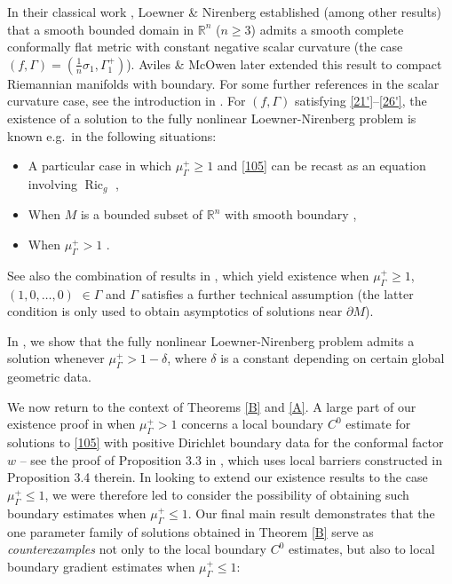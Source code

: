 \documentclass[12pt]{article}
\numberwithin{equation}{section}
\theoremstyle{plain}
\theoremstyle{definition}
\begin{document}
In their classical work \cite{LN74}, Loewner \& Nirenberg established (among other results) that a smooth bounded domain in $\mathbb{R}^n$ ($n\geq 3$) admits a smooth complete conformally flat metric with constant negative scalar curvature (the case $(f,\Gamma) = (\frac{1}{n}\sigma_1,\Gamma_1^+)$). Aviles \& McOwen \cite{AM88} later extended this result to compact Riemannian manifolds with boundary. For some further references in the scalar curvature case, see the introduction in \cite{DN23}. For $(f,\Gamma)$ satisfying \eqref{21'}--\eqref{26'}, the existence of a solution to the fully nonlinear Loewner-Nirenberg problem is known e.g.~in the following situations:\smallskip
\begin{itemize}
	\item A particular case in which $\mu_\Gamma^+ \geq 1$ and \eqref{105} can be recast as an equation involving $\operatorname{Ric}_g$ \cite{GSW11},\smallskip
	\item When $M$ is a bounded subset of $\mathbb{R}^n$ with smooth boundary \cite{GLN18},\smallskip
	\item When $\mu_\Gamma^+>1$ \cite{DN23}.
\end{itemize}
See also the combination of results in \cite{Yuan22, Yuan24}, which yield existence when $\mu_\Gamma^+ \geq 1$, $(1,0,\dots,0)$ $ \in\Gamma$ and $\Gamma$ satisfies a further technical assumption (the latter condition is only used to obtain asymptotics of solutions near $\partial M$). \medskip 

In \cite{DN25b}, we show that the fully nonlinear Loewner-Nirenberg problem admits a solution whenever $\mu_\Gamma^+>1-\delta$, where $\delta$ is a constant depending on certain global geometric data. \medskip 



We now return to the context of Theorems \ref{B} and \ref{A}. A large part of our existence proof in \cite{DN23} when $\mu_\Gamma^+> 1$ concerns a local boundary $C^0$ estimate for solutions to \eqref{105} with positive Dirichlet boundary data for the conformal factor $w$ -- see the proof of Proposition 3.3 in \cite{DN23}, which uses local barriers constructed in Proposition 3.4 therein. In looking to extend our existence results to the case $\mu_\Gamma^+ \leq 1$, we were therefore led to consider the possibility of obtaining such boundary estimates when $\mu_\Gamma^+ \leq 1$. Our final main result demonstrates that the one parameter family of solutions obtained in Theorem \ref{B} serve as \textit{counterexamples} not only to the local boundary $C^0$ estimates, but also to local boundary gradient estimates when $\mu_\Gamma^+ \leq 1$:
\end{document}
